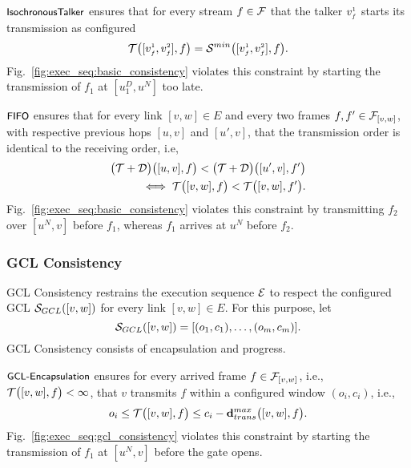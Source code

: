 \textbf{$\IT$} \label{sec:execution_sequences:basic_consistency:it}
ensures that for every stream $f \in \TT$ that the talker $\v{1}{f}$ starts its transmission as configured 
\begin{equation*}
  \T{[\v{1}{f}, \v{2}{f}], f} = \Smin{[\v{1}{f}, \v{2}{f}], f}.
\end{equation*}
Fig.~\ref{fig:exec_seq:basic_consistency} violates this constraint by starting the transmission of $f_1$ at $[u_1^D, u^N]$ too late.

\textbf{$\FIFO$} \label{sec:execution_sequences:basic_consistency:fifo}
ensures that for every link $[v,w] \in E$ and every two frames $f, f' \in \TT_{[v,w]}$, with respective previous hops $[u,v]$ and $[u',v]$, that the transmission order is identical to the receiving order, i.e,
\begin{align*}
  \add{\T}{\D}{[u,v], f} < \add{\T}{\D}{[u',v], f'} \\
    \iff \T{[v,w], f} < \T{[v,w], f'}.
\end{align*}
Fig.~\ref{fig:exec_seq:basic_consistency} violates this constraint by transmitting $f_2$ over $[u^N, v]$ before $f_1$, whereas $f_1$ arrives at $u^N$ before $f_2$.

\subsubsection{GCL Consistency}\label{sec:execution_sequences:gcl}
GCL Consistency restrains the execution sequence $\E$ to respect the configured GCL $\GCL([v,w])$ for every link $[v,w] \in E$.
For this purpose, let
\begin{equation*}
    \GCL([v,w]) = [(o_1,c_1), \ldots, (o_m,c_m)].
\end{equation*}
GCL Consistency consists of encapsulation and progress.

\textbf{$\GCLC$} \label{sec:execution_sequence:gcl:completeness}
ensures for every arrived frame $f \in \TT_{[v,w]}$, i.e., $\T{[v,w],f} < \infty$, that $v$ transmits $f$ within a configured window $(o_i, c_i)$, i.e.,
\begin{equation}\label{eq:gclc}
    o_i \leq \T{[v,w], f} \leq c_i - \dpdbtransmax{[v,w], f}.
\end{equation}
Fig.~\ref{fig:exec_seq:gcl_consistency} violates this constraint by starting the transmission of $f_1$ at $[u^N, v]$ before the gate opens.


